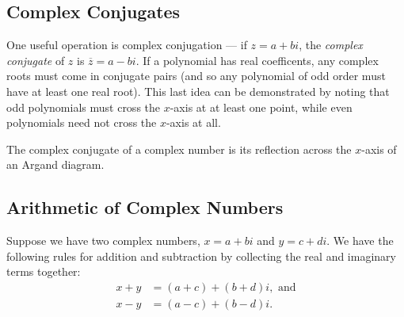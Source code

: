 \documentclass[a4paper,10pt,titlepage]{article}
\theoremstyle{definition}
\begin{document}
\subsection*{Complex Conjugates}
One useful operation is complex conjugation --- if $ z = a+bi $, the
\emph{complex conjugate} of $ z $ is $ \overline z = a-bi $. If a polynomial has
real coefficents, any complex roots must come in conjugate pairs (and so any
polynomial of odd order must have at least one real root). This last idea can be
demonstrated by noting that odd polynomials must cross the $ x$-axis at at least
one point, while even polynomials need not cross the $ x$-axis at all.

The complex conjugate of a complex number is its reflection across the $ x$-axis
of an Argand diagram.

\subsection*{Arithmetic of Complex Numbers}
Suppose we have two complex numbers, $ x = a + bi $ and $ y = c + di $. We have
the following rules for addition and subtraction by collecting the real and imaginary
terms together:
\begin{align*}
  x + y &= (a + c) + (b + d)i, \text{ and} \\
  x - y &= (a - c) + (b - d)i.
\end{align*}
\end{document}
